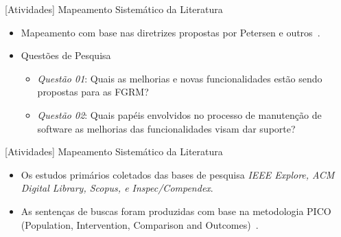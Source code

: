 \documentclass[t,14pt,mathserif]{beamer}
\begin{document}
\begin{frame}{[Atividades] Mapeamento Sistemático da Literatura}

    \begin{itemize}
        \item Mapeamento com base nas diretrizes propostas por Petersen e
            outros~\cite{Petersen2008}.
        \item Questões de Pesquisa
            \begin{itemize}
                \item \textit{Questão 01}: Quais as melhorias e novas
                funcionalidades estão sendo propostas para as FGRM\@?
                \item \textit{Questão 02}: Quais papéis envolvidos no processo de
                    manutenção de software as melhorias das funcionalidades visam
                    dar suporte?
            \end{itemize}
    \end{itemize}

\end{frame}

\begin{frame}{[Atividades] Mapeamento Sistemático da Literatura}

    \begin{itemize}
       \item Os estudos primários coletados das bases de pesquisa \textit{IEEE
             Explore, ACM Digital Library, Scopus, e Inspec/Compendex}.
     \item As sentenças de buscas foram produzidas com base na metodologia PICO
          (Population, Intervention, Comparison and
          Outcomes)~\cite{keele2007guidelines}.
    \end{itemize}

\end{frame}
\end{document}
